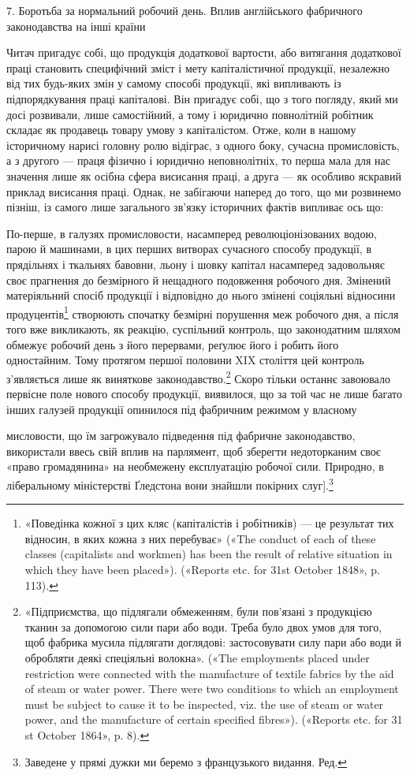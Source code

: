 7. Боротьба за нормальний робочий день. Вплив англійського
фабричного законодавства на інші країни

Читач пригадує собі, що продукція додаткової вартости, або
витягання додаткової праці становить специфічний зміст і мету
капіталістичної продукції, незалежно від тих будь-яких змін
у самому способі продукції, які випливають із підпорядкування
праці капіталові. Він пригадує собі, що з того погляду, який
ми досі розвивали, лише самостійний, а тому і юридично повнолітній
робітник складає як продавець товару умову з капіталістом.
Отже, коли в нашому історичному нарисі головну ролю
відіграє, з одного боку, сучасна промисловість, а з другого —
праця фізично і юридично неповнолітніх, то перша мала для
нас значення лише як осібна сфера висисання праці, а друга —
як особливо яскравий приклад висисання праці. Однак, не забігаючи
наперед до того, що ми розвинемо пізніш, із самого лише
загального зв’язку історичних фактів випливає ось що:

По-перше, в галузях промисловости, насамперед революціонізованих
водою, парою й машинами, в цих перших витворах сучасного
способу продукції, в прядільнях і ткальнях бавовни,
льону і шовку капітал насамперед задовольняє своє прагнення
до безмірного й нещадного подовження робочого дня. Змінений
матеріяльний спосіб продукції і відповідно до нього змінені
соціяльні відносини продуцентів\footnote{
«Поведінка кожної з цих кляс (капіталістів і робітників) — це
результат тих відносин, в яких кожна з них перебуває» («The conduct
of each of these classes (capitalists and workmen) has been the result of
relative situation in which they have been placed»). («Reports etc. for 31st
October 1848», p. 113).
} створюють спочатку безмірні
порушення меж робочого дня, а після того вже викликають,
як реакцію, суспільний контроль, що законодатним шляхом
обмежує робочий день з його перервами, реґулює його і робить
його одностайним. Тому протягом першої половини XIX століття
цей контроль з’являється лише як виняткове законодавство.\footnote{
«Підприємства, що підлягали обмеженням, були пов’язані з
продукцією тканин за допомогою сили пари або води. Треба було двох
умов для того, щоб фабрика мусила підлягати доглядові: застосовувати
силу пари або води й обробляти деякі спеціяльні волокна». («The employments
placed under restriction were connected with the manufacture of
textile fabrics by the aid of steam or water power. There were two conditions
to which an employment must be subject to cause it to be inspected,
viz. the use of steam or water power, and the manufacture of certain specified
fibres»). («Reports etc. for 31 st October 1864», p. 8).
}
Скоро тільки останнє завоювало первісне поле нового способу
продукції, виявилося, що за той час не лише багато інших галузей
продукції опинилося під фабричним режимом у власному

мисловости, що їм загрожувало підведення під фабричне законодавство,
використали ввесь свій вплив на парлямент, щоб зберегти недоторканим
своє «право громадянина» на необмежену експлуатацію робочої сили.
Природно, в ліберальному міністерстві Ґледстона вони знайшли покірних
слуг].\footnote*{
Заведене у прямі дужки ми беремо з французького видання. Ред.
}